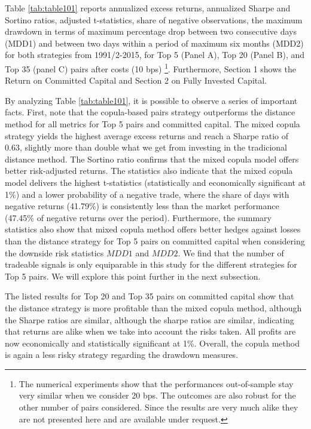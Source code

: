 \documentclass[a4paper]{article}
\begin{document}
Table \ref{tab:table101} reports annualized excess returns, annualized Sharpe and Sortino ratios, \citet*{nw87} adjusted t-statistics, share of negative observations, the maximum drawdown in terms of maximum percentage drop between two consecutive days (MDD1) and between two days within a period of maximum six months (MDD2) for both strategies from 1991/2-2015, for Top 5 (Panel A), Top 20 (Panel B), and Top 35 (panel C) pairs after costs (10 bps) \footnote{The numerical experiments show that the performances out-of-sample stay very similar when we consider 20 bps. The outcomes are also robust for the other number of pairs considered. Since the results are very much alike they are not presented here and are available under request. }. Furthermore, Section 1 shows the Return on Committed Capital and Section 2 on Fully Invested Capital. %
	
By analyzing Table \ref{tab:table101}, it is possible to observe a series of important facts. First, note that the copula-based pairs strategy outperforms the distance method for all metrics for Top 5 pairs and committed capital. The mixed copula strategy yields the highest average excess returns and reach a Sharpe ratio of 0.63, slightly more than double what we get from investing in the tradicional distance method. The Sortino ratio confirms that the mixed copula model offers better risk-adjusted returns. The statistics also indicate that the mixed copula model delivers the highest t-statistics (statistically and economically significant at 1\%) and a lower probability of a negative trade, where the share of days with negative returns (41.79\%) is consistently less than the market performance (47.45\% of negative returns over the period). Furthermore, the summary statistics also show that mixed copula method offers better hedges against losses than the distance strategy for Top 5 pairs on committed capital when considering the downside risk statistics $MDD1$ and $MDD2$. We find that the number of tradeable signals is only equiparable in this study for the different strategies for Top 5 pairs. We will explore this point further in the next subsection.

 The listed results for Top 20 and Top 35 pairs on committed capital show that the distance strategy is more profitable than the mixed copula method, although the Sharpe ratios are similar, although the sharpe ratios are similar, indicating that returns are alike when we take into account the risks taken. All profits are now economically and statistically significant at 1\%. Overall, the copula method is again a less risky strategy regarding the drawdown measures.
\end{document}
